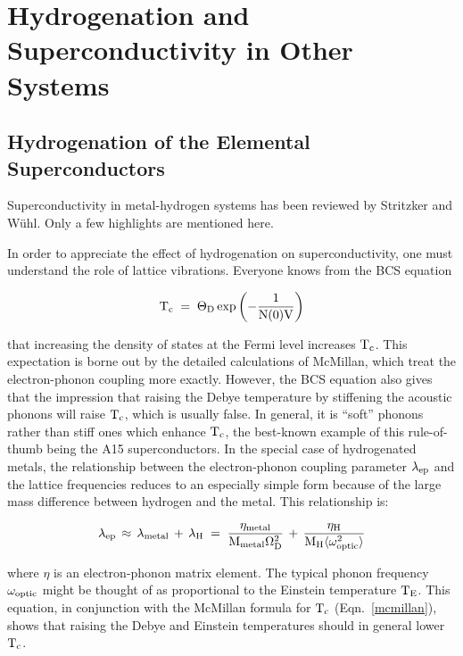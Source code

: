 \section{Hydrogenation and Superconductivity in Other Systems}
\label{otherhyd}

\subsection{Hydrogenation of the Elemental Superconductors}

        Superconductivity in  metal-hydrogen  systems has been  reviewed by
Stritzker and W\"uhl.\cite{stritzker78} Only a few highlights are mentioned
here.
        
        In order to appreciate the effect of hydrogenation on
superconductivity, one must understand the role of lattice vibrations.
Everyone knows from the BCS equation\cite{bcs}

\[ \rm T_c \; = \; \Theta_D \exp{\left(-\frac{1}{N(0)V}\right)}
\]

\noindent that increasing the density of states at the Fermi level
increases $\rm  T_c$.   This  expectation is  borne  out   by  the detailed
calculations of McMillan,   which treat the electron-phonon  coupling  more
exactly.\cite{mcmillan68} However,  the BCS equation  also gives   that the
impression that raising the Debye  temperature  by  stiffening the acoustic
phonons will raise $\rm T_c$,  which is usually  false.   In general, it is
``soft'' phonons   rather than stiff  ones which   enhance  $\rm  T_c$, the
best-known   example    of     this   rule-of-thumb    being   the      A15
superconductors.\cite{bilbro76} In the special case of hydrogenated metals,
the  relationship  between  the   electron-phonon coupling   parameter $\rm
\lambda_{ep}$ and the  lattice frequencies reduces  to an especially simple
form because of the large mass  difference between hydrogen  and the metal.
This relationship is:\cite{gupta84}

\begin{equation}
\label{lambdacalc}
\rm \lambda_{ep} \, \approx \, \lambda_{metal} \, + \, \lambda_{H} \; = \; \frac{\eta_{metal}}{M_{metal} \Omega_D^2} \, + \, \frac{\eta_H}{M_{H} \langle \omega_{optic}^2 \rangle}
\end{equation}

\noindent where $\eta$ is an electron-phonon matrix
element.\cite{mcmillan68} The typical  phonon  frequency   $\rm \omega_{optic}$
might be thought of as proportional to the Einstein temperature  $\rm T_E$.
This equation, in  conjunction with   the McMillan  formula for  $\rm  T_c$
(Eqn.~\ref{mcmillan}),  shows that  raising     the   Debye   and  Einstein
temperatures should in general lower $\rm T_c$.

